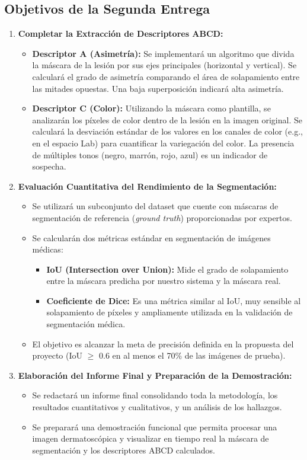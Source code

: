 \documentclass[12pt, a4paper]{article}
\begin{document}
	\subsection{Objetivos de la Segunda Entrega}
	
	\begin{enumerate}
		\item \textbf{Completar la Extracción de Descriptores ABCD:}
		\begin{itemize}
			\item \textbf{Descriptor A (Asimetría):} Se implementará un algoritmo que divida la máscara de la lesión por sus ejes principales (horizontal y vertical). Se calculará el grado de asimetría comparando el área de solapamiento entre las mitades opuestas. Una baja superposición indicará alta asimetría.
			\item \textbf{Descriptor C (Color):} Utilizando la máscara como plantilla, se analizarán los píxeles de color dentro de la lesión en la imagen original. Se calculará la desviación estándar de los valores en los canales de color (e.g., en el espacio Lab) para cuantificar la variegación del color. La presencia de múltiples tonos (negro, marrón, rojo, azul) es un indicador de sospecha.
		\end{itemize}
		
		\item \textbf{Evaluación Cuantitativa del Rendimiento de la Segmentación:}
		\begin{itemize}
			\item Se utilizará un subconjunto del dataset que cuente con máscaras de segmentación de referencia (\textit{ground truth}) proporcionadas por expertos.
			\item Se calcularán dos métricas estándar en segmentación de imágenes médicas:
			\begin{itemize}
				\item \textbf{IoU (Intersection over Union):} Mide el grado de solapamiento entre la máscara predicha por nuestro sistema y la máscara real.
				\item \textbf{Coeficiente de Dice:} Es una métrica similar al IoU, muy sensible al solapamiento de píxeles y ampliamente utilizada en la validación de segmentación médica.
			\end{itemize}
			\item El objetivo es alcanzar la meta de precisión definida en la propuesta del proyecto (IoU $\geq$ 0.6 en al menos el 70\% de las imágenes de prueba).
		\end{itemize}
		
		\item \textbf{Elaboración del Informe Final y Preparación de la Demostración:}
		\begin{itemize}
			\item Se redactará un informe final consolidando toda la metodología, los resultados cuantitativos y cualitativos, y un análisis de los hallazgos.
			\item Se preparará una demostración funcional que permita procesar una imagen dermatoscópica y visualizar en tiempo real la máscara de segmentación y los descriptores ABCD calculados.
		\end{itemize}
	\end{enumerate}
	
\end{document}
